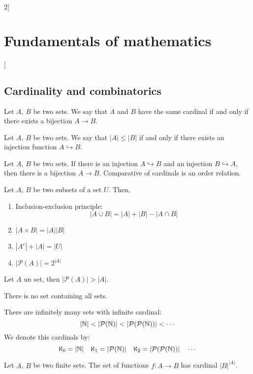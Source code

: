 \documentclass[../../../main_math.tex]{subfiles}
\begin{document}
\begin{multicols}{2}[\section{Fundamentals of mathematics}]
  \subsection{Cardinality and combinatorics}
  \begin{definition}
    Let $A$, $B$ be two sets. We say that $A$ and $B$ have the same cardinal if and only if there exists a bijection $A\rightarrow B$.
  \end{definition}
  \begin{definition}
    Let $A$, $B$ be two sets. We say that $|A|\leq|B|$ if and only if there exists an injection function $A\hookrightarrow B$.
  \end{definition}
  \begin{theorem}
    Let $A$, $B$ be two sets. If there is an injection $A\hookrightarrow B$ and an injection $B\hookrightarrow A$, then there is a bijection $A\rightarrow B$. Comparative of cardinals is an order relation.
  \end{theorem}
  \begin{proposition}
    Let $A$, $B$ be two subsets of a set $U$. Then,
    \begin{enumerate}
      \item Inclusion-exclusion principle: $$|A\cup B|=|A|+|B|-|A\cap B|$$
      \item $|A\times B|=|A||B|$
      \item $|A^c|+|A|=|U|$
      \item $|\mathcal{P}(A)|=2^{|A|}$
    \end{enumerate}
  \end{proposition}
  \begin{theorem}
    Let $A$ un set, then $|\mathcal{P}(A)|>|A|$.
  \end{theorem}
  \begin{corollary}
    There is no set containing all sets.
  \end{corollary}
  \begin{corollary}
    There are infinitely many sets with infinite cardinal: $$|\NN|<|\mathcal{P}(\NN)|<|\mathcal{P}(\mathcal{P}(\NN))|<\cdots$$ We denote this cardinals by: $$\aleph_0=|\mathbb{N}|\quad \aleph_1=|\mathcal{P}(\mathbb{N})|\quad \aleph_2=|\mathcal{P}(\mathcal{P}(\mathbb{N}))|\quad\cdots$$
  \end{corollary}
  \begin{proposition}
    Let $A$, $B$ be two finite sets. The set of functions $f:A\rightarrow B$ has cardinal $|B|^{|A|}$.
  \end{proposition}

\end{multicols}
\end{document}
